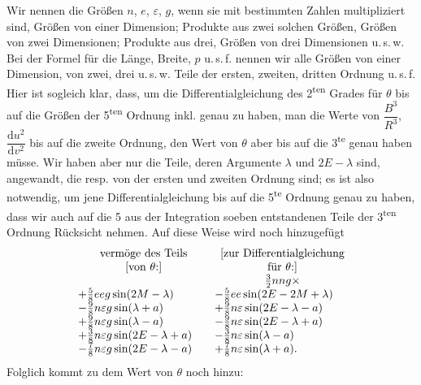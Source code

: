 \clearpage
\begingroup
{}
\renewcommand{\headrulewidth}{0pt}
\par\noindent\hspace*{\parindent}Wir nennen die Größen \(n\), \(e\), \(\varepsilon\), \(g\), wenn sie mit bestimmten Zahlen
multipliziert sind, Größen von einer Dimension; Produkte aus zwei solchen
Größen, Größen von zwei Dimensionen; Produkte aus drei, Größen von
drei Dimensionen u.\,s.\,w. Bei der Formel für die Länge, Breite, \(p\) u.\,s.\,f.
nennen wir alle Größen von einer Dimension, von zwei, drei u.\,s.\,w.
Teile der ersten, zweiten, dritten Ordnung u.\,s.\,f. Hier ist sogleich klar,
dass, um die Differentialgleichung des 2\textsuperscript{ten} Grades für \(\theta\) bis auf die Größen
der 5\textsuperscript{ten} Ordnung inkl. genau zu haben, man die Werte von
\(\dfrac{B^3}{R^3}\), \(\dfrac{\mathrm{d}u^2}{\mathrm{d}v^2}\) bis
auf die zweite Ordnung, den Wert von \(\theta\) aber bis auf die 3\textsuperscript{te} genau haben
müsse. Wir haben aber nur die Teile, deren Argumente \(\lambda\) und \(2E-\lambda\) sind,
angewandt, die resp. von der ersten und zweiten Ordnung sind; es ist also
notwendig, um jene Differentialgleichung bis auf die 5\textsuperscript{te} Ordnung genau zu
haben, dass wir auch auf die 5 aus der Integration soeben entstandenen
Teile der 3\textsuperscript{ten} Ordnung Rücksicht nehmen. Auf diese Weise wird noch hinzugefügt
\begingroup\small
\setlength{\arraycolsep}{5pt}
\renewcommand{\arraystretch}{1.2}
\[
\begin{array}{l@{\qquad}l}
\multicolumn{1}{c}{\text{vermöge des Teils}}&
\multicolumn{1}{c}{\text{[zur Differentialgleichung}}\\
\multicolumn{1}{c}{\text{[von }\theta\text{:]}}&
\multicolumn{1}{c}{\text{für }\theta\text{:]}}\\
&\multicolumn{1}{c}{\tfrac32nng\times}\\
+\tfrac58eeg\sin(2M-\lambda)&-\tfrac58ee\sin(2E-2M+\lambda)\\
-\tfrac98n\varepsilon g\sin(\lambda+a)&+\tfrac98n\varepsilon\sin(2E-\lambda-a)\\
+\tfrac98n\varepsilon g\sin(\lambda-a)&-\tfrac98n\varepsilon\sin(2E-\lambda+a)\\
+\tfrac38n\varepsilon g\sin(2E-\lambda+a)&-\tfrac38n\varepsilon\sin(\lambda-a)\\
-\tfrac78n\varepsilon g\sin(2E-\lambda-a)&+\tfrac78n\varepsilon\sin(\lambda+a).
\end{array}
\]
\endgroup
\noindent Folglich kommt zu dem Wert von \(\theta\) noch hinzu:
